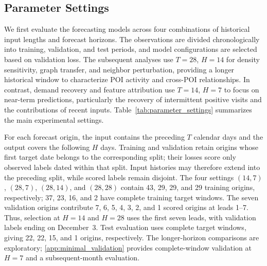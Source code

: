 \documentclass[preprint,authoryear,11pt]{elsarticle}
\theoremstyle{definition}
\begin{document}
\subsection{Parameter Settings}
\label{subsec:parameter_settings}

We first evaluate the forecasting models across four combinations of historical input lengths and forecast horizons. The observations are divided chronologically into training, validation, and test periods, and model configurations are selected based on validation loss. The subsequent analyses use \(T=28\), \(H=14\) for density sensitivity, graph transfer, and neighbor perturbation, providing a longer historical window to characterize POI activity and cross-POI relationships. In contrast, demand recovery and feature attribution use \(T=14\), \(H=7\) to focus on near-term predictions, particularly the recovery of intermittent positive visits and the contributions of recent inputs.
Table~\ref{tab:parameter_settings} summarizes the main experimental settings.

For each forecast origin, the input contains the preceding \(T\) calendar days and the output covers the following \(H\) days. Training and validation retain origins whose first target date belongs to the corresponding split; their losses score only observed labels dated within that split. Input histories may therefore extend into the preceding split, while scored labels remain disjoint. The four settings \((14,7)\), \((28,7)\), \((28,14)\), and \((28,28)\) contain 43, 29, 29, and 29 training origins, respectively; 37, 23, 16, and 2 have complete training target windows. The seven validation origins contribute 7, 6, 5, 4, 3, 2, and 1 scored origins at leads 1--7. Thus, selection at \(H=14\) and \(H=28\) uses the first seven leads, with validation labels ending on December~3. Test evaluation uses complete target windows, giving 22, 22, 15, and 1 origins, respectively. The longer-horizon comparisons are exploratory; \ref{app:minimal_validation} provides complete-window validation at \(H=7\) and a subsequent-month evaluation.
\end{document}
